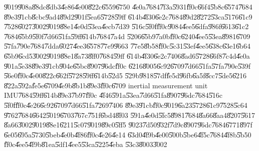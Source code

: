 \documentclass[12pt,a4paper]{article}
\begin{document}
\U{9019}\U{908a}\U{88dc}\U{8db3}\U{4e86}\U{4e00}\U{822c}\U{6559}\U{6750}%
\U{4e0a}\U{7684}\U{7f3a}\U{5931}\U{ff0c}\U{66f4}\U{5b8c}\U{6574}\U{7684}%
\U{89e3}\U{91cb}\U{8cbc}\U{9ad4}\U{89d2}\U{901f}\U{5ea6}\U{5728}\U{59ff}%
\U{614b}\U{4f30}\U{6e2c}\U{7684}\U{89d2}\U{8272}\U{53ca}\U{5176}\U{61c9}%
\U{7528}\U{6027}\U{3002}\U{9019}\U{88e1}\U{4e0d}\U{53ea}\U{4ecb}\U{7d39}%
\U{516c}\U{5f0f}\U{ff0c}\U{9084}\U{4ee5}\U{6dfa}\U{986f}\U{6613}\U{61c2}%
\U{7684}\U{65b9}\U{5f0f}\U{7d66}\U{51fa}\U{59ff}\U{614b}\U{7684}\U{7a4d}%
\U{5206}\U{65b9}\U{7a0b}\U{ff0c}\U{6240}\U{4ee5}\U{53ea}\U{8981}\U{6709}%
\U{57fa}\U{790e}\U{7684}\U{7dda}\U{6027}\U{4ee3}\U{6578}\U{77e9}\U{9663}%
\U{77e5}\U{8b58}\U{ff0c}\U{5c31}\U{53ef}\U{4ee5}\U{638c}\U{63e1}\U{6b64}%
\U{65b9}\U{6cd5}\U{3002}\U{9019}\U{88e1}\U{8a73}\U{8ff0}\U{7684}\U{59ff}%
\U{614b}\U{4f30}\U{6e2c}\U{7406}\U{8ad6}\U{5728}\U{66f8}\U{7c4d}\U{4e0a}%
\U{901a}\U{5e38}\U{89e3}\U{91cb}\U{904e}\U{65bc}\U{8907}\U{96dc}\U{ff0c}%
\U{6216}\U{8005}\U{6c92}\U{6709}\U{7d66}\U{51fa}\U{57fa}\U{790e}\U{539f}%
\U{56e0}\U{ff0c}\U{4e00}\U{822c}\U{662f}\U{5728}\U{59ff}\U{614b}\U{52d5}%
\U{529b}\U{9818}\U{57df}\U{fe5d}\U{96fb}\U{6a5f}\U{8cc7}\U{5de5}\U{6216}%
\U{822a}\U{592a}\U{fe5e}\U{6709}\U{4e9b}\U{8b1b}\U{89e3}\U{ff0c}\U{6709}%
inertial measurement unit IMU\U{7684}\U{59ff}\U{614b}\U{89e3}\U{7b97}\U{ff0c}%
\U{4f46}\U{591a}\U{53ea}\U{7d66}\U{51fa}\U{8907}\U{96dc}\U{7684}\U{516c}%
\U{5f0f}\U{ff0c}\U{4e26}\U{6c92}\U{6709}\U{7d66}\U{51fa}\U{7269}\U{7406}%
\U{89e3}\U{91cb}\U{ff0c}\U{9019}\U{6a23}\U{5728}\U{61c9}\U{7528}\U{5c64}%
\U{9762}\U{7684}\U{6642}\U{5019}\U{6703}\U{767c}\U{751f}\U{6bd4}\U{8f03}%
\U{591a}\U{4e0d}\U{5fc5}\U{8981}\U{7684}\U{8a66}\U{8aa4}\U{8207}\U{5617}%
\U{8a66}\U{3002}\U{9019}\U{88e1}\U{6211}\U{5c07}\U{9019}\U{89c0}\U{5ff5}%
\U{9023}\U{7d50}\U{932f}\U{7d9c}\U{8907}\U{96dc}\U{7684}\U{6771}\U{897f}%
\U{6e05}\U{695a}\U{5730}\U{5beb}\U{4e0b}\U{4f86}\U{ff0c}\U{4e26}\U{4e14}%
\U{63d0}\U{4f9b}\U{4e00}\U{500b}\U{5be6}\U{4f5c}\U{7684}\U{4f8b}\U{5b50}%
\U{ff0c}\U{4ee5}\U{4f9b}\U{81ea}\U{5df1}\U{4ee5}\U{53ca}\U{5225}\U{4eba}%
\U{53c3}\U{8003}\U{3002}

\bigskip
\end{document}
